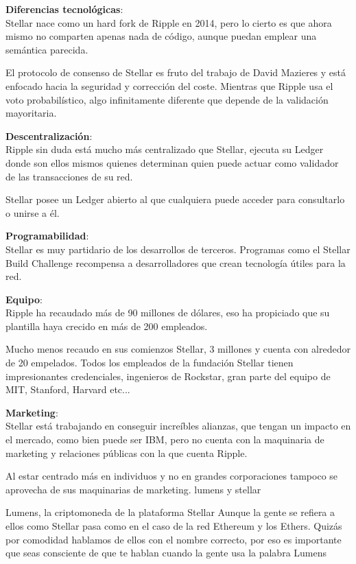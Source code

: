 \documentclass[a4paper,12pt]{/home/armando/Documentos/Cursos/LaTeX/Plantillas/lib/pub}
\begin{document}
	\textbf{Diferencias tecnológicas}:\\
	Stellar nace como un hard fork de Ripple en 2014, pero lo cierto es que ahora mismo no comparten apenas nada de código, aunque puedan emplear una semántica parecida.
	
	El protocolo de consenso de Stellar es fruto del trabajo de David Mazieres y está enfocado hacia la seguridad y corrección del coste. Mientras que Ripple usa el voto probabilístico, algo infinitamente diferente que depende de la validación mayoritaria.
	
	\textbf{Descentralización}:\\
	Ripple sin duda está mucho más centralizado que Stellar, ejecuta su Ledger donde son ellos mismos quienes determinan quien puede actuar como validador de las transacciones de su red.
	
	Stellar posee un Ledger abierto al que cualquiera puede acceder para consultarlo o unirse a él.
	
	\textbf{Programabilidad}:\\
	Stellar es muy partidario de los desarrollos de terceros. Programas como el Stellar Build Challenge recompensa a desarrolladores que crean tecnología útiles para la red.
	
	\textbf{Equipo}:\\
	Ripple ha recaudado más de 90 millones de dólares, eso ha propiciado que su plantilla haya crecido en más de 200 empleados.
	
	Mucho menos recaudo en sus comienzos Stellar, 3 millones y cuenta con alrededor de 20 empelados. Todos los empleados de la fundación Stellar tienen impresionantes credenciales, ingenieros de Rockstar, gran parte del equipo de MIT, Stanford, Harvard etc...
	
	\textbf{Marketing}:\\
	Stellar está trabajando en conseguir increíbles alianzas, que tengan un impacto en el mercado, como bien puede ser IBM, pero no cuenta con la maquinaria de marketing y relaciones públicas con la que cuenta Ripple.
	
	Al estar centrado más en individuos y no en grandes corporaciones tampoco se aprovecha de sus maquinarias de marketing.
	lumens y stellar
	
	Lumens, la criptomoneda de la plataforma Stellar
	Aunque la gente se refiera a ellos como Stellar pasa como en el caso de la red Ethereum y los Ethers. Quizás por comodidad hablamos de ellos con el nombre correcto, por eso es importante que seas consciente de que te hablan cuando la gente usa la palabra Lumens
	
\end{document}
